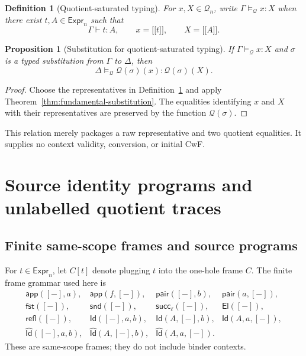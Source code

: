 \documentclass[10pt,reqno]{amsart}
\newtheorem{proposition}[theorem]{Proposition}
\newtheorem{definition}[theorem]{Definition}
\newcommand{\Expr}{\mathsf{Expr}}
\newcommand{\App}{\mathsf{app}}
\newcommand{\Pair}{\mathsf{pair}}
\newcommand{\Fst}{\mathsf{fst}}
\newcommand{\Snd}{\mathsf{snd}}
\newcommand{\Succ}{\mathsf{succ}}
\newcommand{\CodeId}{\widehat{\mathsf{Id}}}
\newcommand{\El}{\mathsf{El}}
\newcommand{\IdTy}{\mathsf{Id}}
\newcommand{\Refl}{\mathsf{refl}}
\newcommand{\den}[1]{\mathopen{\lbrack\!\lbrack}#1\mathclose{\rbrack\!\rbrack}}
\newcommand{\Q}{\mathcal{Q}}
\begin{document}
\begin{definition}[Quotient-saturated typing]
\label{def:quotient-typing}
For \(x,X\in\Q_n\), write
\(\Gamma\models_{\Q}x:X\) when there exist \(t,A\in\Expr_n\) such that
\[
             \Gamma\vdash t:A,\qquad x=\den t,\qquad X=\den A.
\]
\end{definition}

\begin{proposition}[Substitution for quotient-saturated typing]
\label{prop:quotient-typing-substitution}
If \(\Gamma\models_{\Q}x:X\) and \(\sigma\) is a typed substitution from
\(\Gamma\) to \(\Delta\), then
\[
        \Delta\models_{\Q}\Q(\sigma)(x):\Q(\sigma)(X).
\]
\end{proposition}

\begin{proof}
Choose the representatives in Definition~\ref{def:quotient-typing} and
apply Theorem~\ref{thm:fundamental-substitution}.  The equalities identifying
\(x\) and \(X\) with their representatives are preserved by the function
\(\Q(\sigma)\).
\end{proof}

This relation merely packages a raw representative and two quotient
equalities.  It supplies no context validity, conversion, or initial CwF.

\section{Source identity programs and unlabelled quotient traces}
\label{sec:identity-programs}

\subsection{Finite same-scope frames and source programs}

For \(t\in\Expr_n\), let \(C[t]\) denote plugging \(t\) into the one-hole
frame \(C\).  The finite frame grammar used here is
\[
\begin{array}{llll}
\App([-],a),&\App(f,[-]),&
\Pair([-],b),&\Pair(a,[-]),\\
\Fst([-]),&\Snd([-]),&\Succ_\ell([-]),&\El([-]),\\
\Refl([-]),&
\IdTy([-],a,b),&\IdTy(A,[-],b),&\IdTy(A,a,[-]),\\
\CodeId([-],a,b),&\CodeId(A,[-],b),&\CodeId(A,a,[-]).
\end{array}
\tag{8.1}\label{eq:frames}
\]
These are same-scope frames; they do not include binder contexts.
\end{document}
